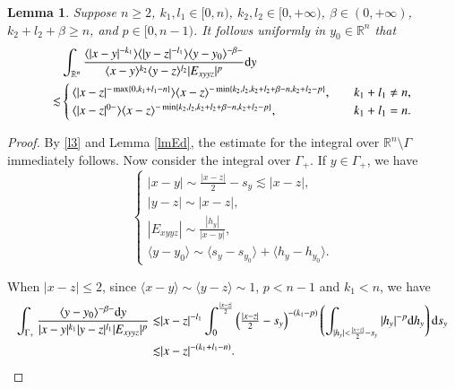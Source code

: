 \documentclass[11pt,reqno]{amsart}
\def\d{{\rm d}}
\newtheorem{lemma}[theorem]{Lemma}
\numberwithin{equation}{section}
\theoremstyle{definition}
\begin{document}
\begin{appendix}
	\begin{lemma}\label{oneline}
		Suppose $n\geq2$, $k_1,l_1\in[0,n)$, $k_2,l_2\in[0,+\infty)$, $\beta\in(0,+\infty)$, $k_2+l_2+\beta\geq n$, and $p\in[0,n-1)$. It follows uniformly in $y_0\in\mathbb{R}^n$ that
		\begin{equation}\label{l5}
			\begin{split}
				&\int_{\mathbb{R}^n}\frac{\langle|x-y|^{-k_1}\rangle\langle|y-z|^{-l_1}\rangle\langle y-y_0\rangle^{-\beta-}}{\langle x-y\rangle^{k_2}\langle y-z\rangle^{l_2}|E_{xyyz}|^p}\d y\\
				\lesssim&\begin{cases}
					\langle|x-z|^{-\max\{0,k_1+l_1-n\}}\rangle\langle x-z\rangle^{-\min\{k_2,l_2,k_2+l_2+\beta-n,k_2+l_2-p\}},\quad&k_1+l_1\neq n,\\
					\langle|x-z|^{0-}\rangle\langle x-z\rangle^{-\min\{k_2,l_2,k_2+l_2+\beta-n,k_2+l_2-p\}},&k_1+l_1=n.
				\end{cases}
			\end{split}
		\end{equation}
	\end{lemma}
	
	\begin{proof}
		By \eqref{l3} and Lemma \ref{lmEd}, the estimate for the integral over $\mathbb{R}^n\setminus\Gamma$ immediately follows. Now consider the integral over $\Gamma_+$. If $y\in\Gamma_+$, we have
		\begin{equation}\label{esim}
			\begin{cases}
				|x-y|\sim\frac{|x-z|}{2}-s_y\lesssim|x-z|,\\
				|y-z|\sim|x-z|,\\
				|E_{xyyz}|\sim\frac{|h_y|}{|x-y|},\\
				\langle y-y_0\rangle\sim\langle s_y-s_{y_0}\rangle+\langle h_y-h_{y_0}\rangle.
			\end{cases}
		\end{equation}
		
		When $|x-z|\leq2$, since $\langle x-y\rangle\sim\langle y-z\rangle\sim1$, $p<n-1$ and $k_1<n$, we have
		\begin{equation}\label{l7}
			\begin{split}
				\int_{\Gamma_+}\frac{\langle y-y_0\rangle^{-\beta-}\d y}{|x-y|^{k_1}|y-z|^{l_1}|E_{xyyz}|^p}\lesssim&|x-z|^{-l_1}\int_0^\frac{|x-z|}{2}\left(\mbox{$\frac{|x-z|}{2}-s_y$}\right)^{-(k_1-p)}\left(\int_{|h_y|<\frac{|x-z|}{2}-s_y}|h_y|^{-p}\d h_y\right)\d s_y\\
				\lesssim&|x-z|^{-(k_1+l_1-n)}.
			\end{split}
		\end{equation}
		

\end{proof}
\end{appendix}
\end{document}

